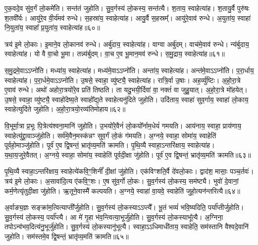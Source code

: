 ए॒क॒वदे॒व सु॑व॒र्गं लो॒कमे॑ति।
सन्त॑तं जुहोति।
सु॒व॒र्गस्य॑ लो॒कस्य॒ सन्त॑त्यै।
श॒ताय॒ स्वाहेत्या॑ह।
श॒तायु॒र्वै पुरु॑षः श॒तवी᳚र्यः।
आयु॑रे॒व वी॒र्य॑मव॑ रुन्धे।
स॒हस्रा॑य॒ स्वाहेत्या॑ह।
आयु॒र्वै स॒हस्रम्᳚।
आयु॑रे॒वाव॑ रुन्धे।
अ॒युता॑य॒ स्वाहा॑ नि॒युता॑य॒ स्वाहा᳚ प्र॒युता॑य॒ स्वाहेत्या॑ह॥६०॥\ip

त्रय॑ इ॒मे लो॒काः।
इ॒माने॒व लो॒कानव॑ रुन्धे।
अर्बु॑दाय॒ स्वाहेत्या॑ह।
वाग्वा अर्बु॑दम्।
वाच॑मे॒वाव॑ रुन्धे।
न्य॑र्बुदाय॒ स्वाहेत्या॑ह।
यो वै वा॒चो भू॒मा।
तन्न्य॑र्बुदम्।
वा॒च ए॒व भू॒मान॒मव॑ रुन्धे।
स॒मु॒द्राय॒ स्वाहेत्या॑ह॥६१॥\ip

स॒मु॒द्रमे॒वाऽऽप्नो॑ति।
मध्या॑य॒ स्वाहेत्या॑ह।
मध्य॑मे॒वाऽऽप्नो॑ति।
अन्ता॑य॒ स्वाहेत्या॑ह।
अन्त॑मे॒वाऽऽप्नो॑ति।
प॒रा॒र्धाय॒ स्वाहेत्या॑ह।
प॒रा॒र्धमे॒वाऽऽप्नो॑ति।
उ॒षसे॒ स्वाहा॒ व्यु॑ष्ट्यै॒ स्वाहेत्या॑ह।
रात्रि॒र्वा उ॒षाः।
अह॒र्व्यु॑ष्टिः।
अ॒हो॒रा॒त्रे ए॒वाव॑ रुन्धे।
अथो॑ अहोरा॒त्रयो॑रे॒व प्रति॑ तिष्ठति।
ता यदु॒भयी॒र्दिवा॑ वा॒ नक्तं॑ वा जुहु॒यात्।
अ॒हो॒रा॒त्रे मो॑हयेत्।
उ॒षसे॒ स्वाहा॒ व्यु॑ष्ट्यै॒ स्वाहो॑देष्य॒ते स्वाहो᳚द्य॒ते स्वाहेत्यनु॑दिते जुहोति।
उदि॑ताय॒ स्वाहा॑ सुव॒र्गाय॒ स्वाहा॑ लो॒काय॒ स्वाहेत्युदि॑ते जुहोति।
अ॒हो॒रा॒त्रयो॒रव्य॑तिमोहाय॥६२॥\ip\anuvakamend[ए॒को॒त्त॒रं जु॑होति प्र॒युता॑य॒ स्वाहेत्या॑ह समु॒द्राय॒ स्वाहेत्या॒हाह॒र्व्यु॑ष्टिः स॒प्त च॑]

वि॒भूर्मा॒त्रा प्र॒भूः पि॒त्रेत्य॑श्वना॒मानि॑ जुहोति।
उ॒भयो॑रे॒वैनं॑ लो॒कयो᳚र्नाम॒धेयं॑ गमयति।
आय॑नाय॒ स्वाहा॒ प्राय॑णाय॒ स्वाहेत्यु॑द्द्रा॒वाञ्जु॑होति।
सर्व॑मे॒वैन॒मस्क॑न्नꣳ सुव॒र्गं लो॒कं ग॑मयति।
अ॒ग्नये॒ स्वाहा॒ सोमा॑य॒ स्वाहेति॑ पूर्वहो॒माञ्जु॑होति।
पूर्व॑ ए॒व द्वि॒षन्तं॒ भ्रातृ॑व्य॒मति॑ क्रामति।
पृ॒थि॒व्यै स्वाहा॒\-ऽन्तरि॑क्षाय॒ स्वाहेत्या॑ह।
य॒था॒\-य॒जु\-रे॒वै\-तत्।
अ॒ग्नये॒ स्वाहा॒ सोमा॑य॒ स्वाहेति॑ पूर्वदी॒क्षा जु॑होति।
पूर्व॑ ए॒व द्वि॒षन्तं॒ भ्रातृ॑व्य॒मति॑ क्रामति॥६३॥\ip

पृ॒थि॒व्यै स्वाहा॒\-ऽन्तरि॑क्षाय॒ स्वाहेत्ये॑कवि॒ꣳ॒शिनीं᳚ दी॒क्षां जु॑होति।
एक॑विꣳशति॒र्वै दे॑वलो॒काः।
द्वाद॑श॒ मासाः॒ पञ्च॒र्तवः॑।
त्रय॑ इ॒मे लो॒काः।
अ॒सावा॑दि॒त्य ए॑कवि॒ꣳ॒शः।
ए॒ष सु॑व॒र्गो लो॒कः।
सु॒व॒र्गस्य॑ लो॒कस्य॒ सम॑ष्ट्यै।
भुवो॑ दे॒वानां॒ कर्म॒णेत्यृ॑तुदी॒क्षा जु॑होति।
ऋ॒तूने॒वास्मै॑ कल्पयति।
अ॒ग्नये॒ स्वाहा॑ वा॒यवे॒ स्वाहेति॑ जुहो॒त्यन॑न्तरित्यै॥६४॥\ip

अ॒र्वाङ्य॒ज्ञः सङ्क्रा॑म॒त्वित्याप्ती᳚र्जुहोति।
सु॒व॒र्गस्य॑ लो॒कस्याऽऽप्त्यै᳚।
भू॒तं भव्यं॑ भवि॒ष्यदिति॒ पर्या᳚प्तीर्जुहोति।
सु॒व॒र्गस्य॑ लो॒कस्य॒ पर्या᳚प्त्यै।
आ मे॑ गृ॒हा भ॑व॒न्त्वित्या॒भूर्जु॑होति।
सु॒व॒र्गस्य॑ लो॒कस्याभू᳚त्यै।
अ॒ग्निना॒ तपो\-ऽन्व॑भव॒दित्य॑नु॒भूर्जु॑होति।
सु॒व॒र्गस्य॑ लो॒कस्यानु॑भूत्यै।
स्वाहा॒\-ऽऽधिमाधी॑ताय॒ स्वाहेति॒ सम॑स्तानि वैश्वदे॒वानि॑ जुहोति।
सम॑स्तमे॒व द्वि॒षन्तं॒ भ्रातृ॑व्य॒मति॑ क्रामति॥६५॥\ip

